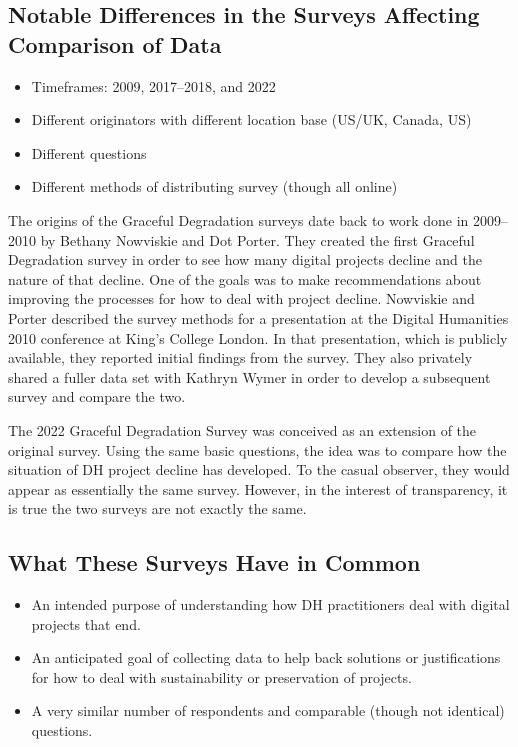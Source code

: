 \documentclass[final]{anthology-ch}
\begin{document}
\subsection{Notable Differences in the Surveys Affecting Comparison of Data}

\begin{itemize}
  \item Timeframes: 2009, 2017--2018, and 2022
  \item Different originators with different location base (US/UK, Canada, US)
  \item Different questions
  \item Different methods of distributing survey (though all online)
\end{itemize}

The origins of the Graceful Degradation surveys date back to work done in 2009--2010 by Bethany Nowviskie and Dot Porter. They created the first Graceful Degradation survey in order to see how many digital projects decline and the nature of that decline. One of the goals was to make recommendations about improving the processes for how to deal with project decline. Nowviskie and Porter \cite{nowviskie2010graceful} described the survey methods for a presentation at the Digital Humanities 2010 conference at King's College London. In that presentation, which is publicly available, they reported initial findings from the survey. They also privately shared a fuller data set with Kathryn Wymer in order to develop a subsequent survey and compare the two.

The 2022 Graceful Degradation Survey was conceived as an extension of the original survey. Using the same basic questions, the idea was to compare how the situation of DH project decline has developed. To the casual observer, they would appear as essentially the same survey. However, in the interest of transparency, it is true the two surveys are not exactly the same.

\subsection{What These Surveys Have in Common}

\begin{itemize}
  \item An intended purpose of understanding how DH practitioners deal with digital projects that end.
  \item An anticipated goal of collecting data to help back solutions or justifications for how to deal with sustainability or preservation of projects.
  \item A very similar number of respondents and comparable (though not identical) questions.
\end{itemize}
\end{document}
